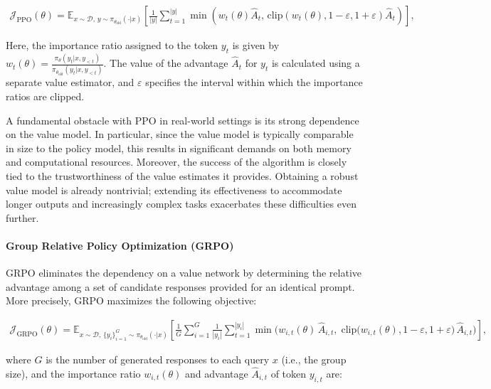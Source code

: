\begin{align}
\mathcal{J}_\text{PPO}(\theta) = \mathbb{E}_{ x \sim \mathcal{D},\, y \sim \pi_{\theta_\text{old}}( \cdot | x) }
\left[ \frac{1}{|y|} \sum_{t=1}^{|y|} 
\min \left( w_{t}(\theta) \widehat{A}_{t},  \, \mathrm{clip} \left( w_{t}(\theta), 1 - {\varepsilon}, 1 + {\varepsilon}\right) \widehat{A}_{t} \right)
\right],
\end{align}

Here, the importance ratio assigned to the token $y_t$ is given by $
w_{t}(\theta) = \frac{ \pi_{\theta} (y_{t} | x, y_{<t}) }{ \pi_{\theta_\text{old}} (y_{t} | x,y_{<t})} $. The value of the advantage $\widehat{A}_{t}$ for $y_t$ is calculated using a separate value estimator, and $\varepsilon$ specifies the interval within which the importance ratios are clipped.

A fundamental obstacle with PPO in real-world settings is its strong dependence on the value model. In particular, since the value model is typically comparable in size to the policy model, this results in significant demands on both memory and computational resources. Moreover, the success of the algorithm is closely tied to the trustworthiness of the value estimates it provides. Obtaining a robust value model is already nontrivial; extending its effectiveness to accommodate longer outputs and increasingly complex tasks exacerbates these difficulties even further.

\paragraph{Group Relative Policy Optimization (GRPO)} GRPO \citep{grpo} eliminates the dependency on a value network by determining the relative advantage among a set of candidate responses provided for an identical prompt. More precisely, GRPO maximizes the following objective:

\begin{align}
\label{equ:grpo}
\mathcal{J}_\text{GRPO}(\theta) = \mathbb{E}_{ x \sim \mathcal{D},\, \{y_i\}_{i=1}^G \sim \pi_{\theta_\text{old}}( \cdot | x) }
\left[ \frac{1}{G} \sum_{i=1}^{G} \frac{1}{|y_i|} \sum_{t=1}^{|y_i|} 
\min \bigg( w_{i,t}(\theta) \, \widehat{A}_{i,t},\;  \mathrm{clip} \big( w_{i,t}(\theta), 1 - {\varepsilon}, 1 + {\varepsilon}\big) \, \widehat{A}_{i,t} \bigg)
\right],
\end{align}

where $G$ is the number of generated responses to each query $x$ (i.e., the group size), and the importance ratio $w_{i,t}(\theta)$ and advantage $\widehat{A}_{i,t}$ of token $y_{i,t}$ are:

